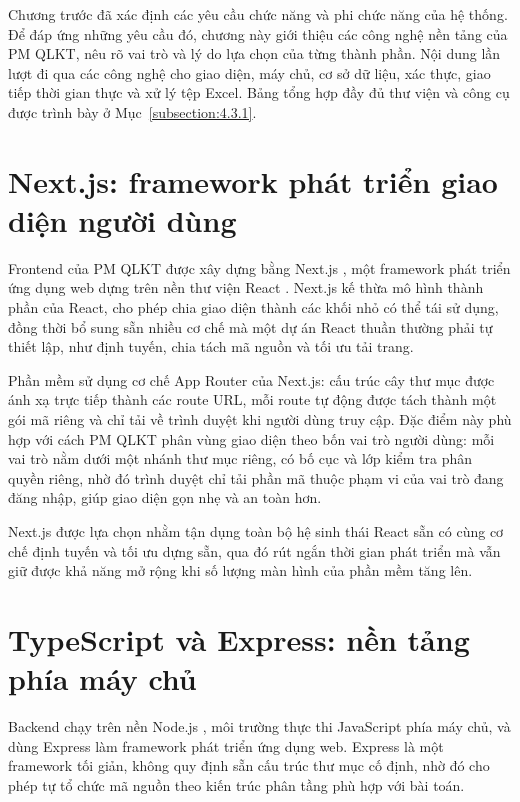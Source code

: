 \documentclass[../DoAn.tex]{subfiles}
\begin{document}
Chương trước đã xác định các yêu cầu chức năng và phi chức năng của hệ thống. Để đáp ứng những yêu cầu đó, chương này giới thiệu các công nghệ nền tảng của PM QLKT, nêu rõ vai trò và lý do lựa chọn của từng thành phần. Nội dung lần lượt đi qua các công nghệ cho giao diện, máy chủ, cơ sở dữ liệu, xác thực, giao tiếp thời gian thực và xử lý tệp Excel. Bảng tổng hợp đầy đủ thư viện và công cụ được trình bày ở Mục~\ref{subsection:4.3.1}.

\section{Next.js: framework phát triển giao diện người dùng}
\label{section:3.1}

Frontend của PM QLKT được xây dựng bằng Next.js \cite{nextjs}, một framework phát triển ứng dụng web dựng trên nền thư viện React \cite{react}. Next.js kế thừa mô hình thành phần của React, cho phép chia giao diện thành các khối nhỏ có thể tái sử dụng, đồng thời bổ sung sẵn nhiều cơ chế mà một dự án React thuần thường phải tự thiết lập, như định tuyến, chia tách mã nguồn và tối ưu tải trang.

Phần mềm sử dụng cơ chế App Router của Next.js: cấu trúc cây thư mục được ánh xạ trực tiếp thành các route URL, mỗi route tự động được tách thành một gói mã riêng và chỉ tải về trình duyệt khi người dùng truy cập. Đặc điểm này phù hợp với cách PM QLKT phân vùng giao diện theo bốn vai trò người dùng: mỗi vai trò nằm dưới một nhánh thư mục riêng, có bố cục và lớp kiểm tra phân quyền riêng, nhờ đó trình duyệt chỉ tải phần mã thuộc phạm vi của vai trò đang đăng nhập, giúp giao diện gọn nhẹ và an toàn hơn.

Next.js được lựa chọn nhằm tận dụng toàn bộ hệ sinh thái React sẵn có cùng cơ chế định tuyến và tối ưu dựng sẵn, qua đó rút ngắn thời gian phát triển mà vẫn giữ được khả năng mở rộng khi số lượng màn hình của phần mềm tăng lên.

\section{TypeScript và Express: nền tảng phía máy chủ}
\label{section:3.2}

Backend chạy trên nền Node.js \cite{nodejs}, môi trường thực thi JavaScript phía máy chủ, và dùng Express \cite{express} làm framework phát triển ứng dụng web. Express là một framework tối giản, không quy định sẵn cấu trúc thư mục cố định, nhờ đó cho phép tự tổ chức mã nguồn theo kiến trúc phân tầng phù hợp với bài toán.
\end{document}
